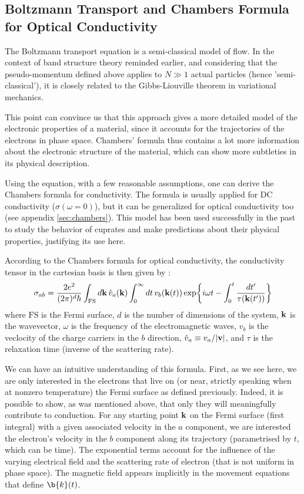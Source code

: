 \subsection{Boltzmann Transport and Chambers Formula for Optical Conductivity}
The Boltzmann transport equation is a semi-classical model of flow. 
In the context of band structure theory reminded earlier, 
and considering that the pseudo-momentum defined above applies to $N\gg 1$ actual particles (hence 'semi-classical'), 
it is closely related to the Gibbs-Liouville theorem in variational mechanics. 

This point can convince us that this approach gives a more detailed model of the electronic properties of a material, 
since it accounts for the trajectories of the electrons in phase space. 
Chambers' formula thus contains a lot more information about the electronic structure
of the material, 
which can show more subtleties in its physical description.

Using the equation, with a few reasonable assumptions, 
one can derive the Chambers formula for conductivity. 
The formula is usually applied for DC conductivity ($\sigma(\omega=0)$), 
but it can be generalized for optical conductivity too (see appendix \ref{sec:chambers}).
This model has been used successfully in the past to study the behavior of cuprates 
and make predictions about their physical properties\cite{grissonnanche2021}, 
justifying its use here.

According to the Chambers formula for optical conductivity, 
the conductivity tensor in the cartesian basis is then given by :
\begin{equation}
	\sigma_{ab} = \frac{2e^2}{(2\pi)^d\hbar}\int_{\mathrm{FS}}\dd{\vb{k}}\hat{v}_a(\vb{k})
        \int_0^{\infty}\dd{t}v_b(\vb{k}(t))\exp{i\omega t
        - \int_0^t \frac{\mathop{dt'}}{\tau(\vb{k}(t'))}}
\end{equation}
where $\mathrm{FS}$ is the Fermi surface, $d$ is the number of dimensions of the system, $\vb{k}$ is the
wavevector, $\omega$ is the frequency of the electromagnetic waves, $v_b$ is the veclocity of the
charge carriers in the $b$ direction, $\hat{v}_a\equiv v_a/\abs{\vb{v}}$, and $\tau$ is the
relaxation time (inverse of the scattering rate). 

We can have an intuitive understanding of this formula. 
First, as we see here, we are only interested in the electrons that live on (or near, strictly speaking when at nonzero temperature) the Fermi surface as defined previously. 
Indeed, it is possible to show, as was mentioned above, that only they will meaningfully contribute to conduction. 
For any starting point $\vb{k}$ on the Fermi surface (first integral) with a given associated velocity in the $a$ component, 
we are interested the electron's velocity in the $b$ component along its trajectory (parametrised by $t$,  which can be time). 
The exponential terms account for the influence of the varying electrical field and the scattering rate of electron (that is not uniform in phase space). 
The magnetic field appears implicitly in the movement equations that define $\b{k}(t)$.


